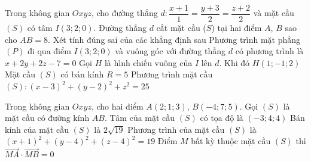 \begin{ex}%
	 Trong không gian $Oxyz$, cho đường thẳng $d\colon \dfrac{x+1}{1}=\dfrac{y+3}{2}=\dfrac{z+2}{2}$ và mặt cầu $(S)$ có tâm $I(3; 2; 0)$. Đường thẳng $d$ cắt mặt cầu ($S$) tại hai điểm $A$, $B$ sao cho $AB=8$. Xét tính đúng sai của các khẳng định sau
	 \choiceTF
		{\True Phương trình mặt phẳng $(P)$ đi qua điểm $I(3; 2; 0)$ và vuông góc với đường thẳng $d$ có phương trình là  $x+2y+2z-7=0$}
		{Gọi $H$ là hình chiếu vuông  của $I$ lên $d$. Khi đó $H(1;-1; 2)$}
		{\True Mặt cầu $(S)$ có  bán kính $R=5$}
		{\True Phương trình mặt cầu $(S)\colon  (x-3)^2+(y-2)^2+z^2=25$}
\end{ex}

\begin{ex}%
	Trong không gian  $Oxyz$, cho hai điểm $A(2; 1; 3)$, $B(-4; 7; 5)$. Gọi $(S)$ là mặt cầu có đường kính $A B$.
	 \choiceTF
		{Tâm của mặt cầu $(S)$ có tọa độ là $(-3;  4; 4)$}
		 {Bán kính của mặt cầu $(S)$ là $2 \sqrt{19}$}
		{\True  Phương trình của mặt cầu $(S)$ là $(x+1)^{2}+(y-4)^{2}+(z-4)^{2}=19$}
		{\True Điểm $M$ bất kỳ thuộc mặt cầu $(S)$ thì  $\overrightarrow{MA} \cdot \overrightarrow{MB}=0$}
\end{ex}


